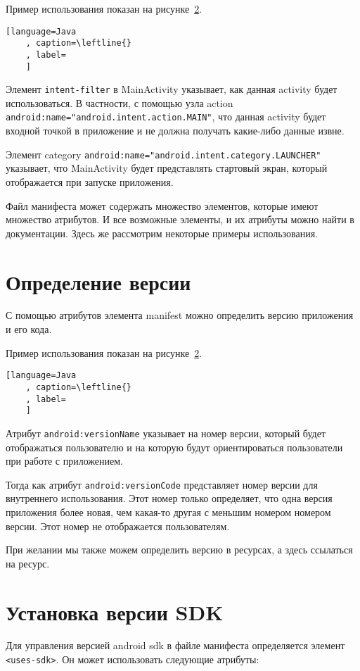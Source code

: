 Пример использования показан на рисунке~\ref{}.

\begin{lstlisting}[language=Java
	, caption=\leftline{}
	, label=
	]
\end{lstlisting}

Элемент \texttt{intent-filter} в MainActivity указывает,
как данная activity будет использоваться. В частности, с помощью узла action
\texttt{android:name="android.intent.action.MAIN"}, что данная activity будет
входной точкой в приложение и не должна получать какие-либо данные извне.\par
Элемент category \texttt{android:name="android.intent.category.LAUNCHER"}
указывает, что MainActivity будет представлять стартовый экран, который
отображается при запуске приложения.\par
Файл манифеста может содержать множество элементов, которые имеют
множество атрибутов. И все возможные элементы, и их атрибуты можно
найти в документации. Здесь же рассмотрим некоторые примеры
использования.

\section{Определение версии}
С помощью атрибутов элемента manifest можно определить версию
приложения и его кода.\par
Пример использования показан на рисунке~\ref{}.

\begin{lstlisting}[language=Java
	, caption=\leftline{}
	, label=
	]
\end{lstlisting}

Атрибут \texttt{android:versionName} указывает на номер версии, который будет
отображаться пользователю и на которую будут ориентироваться
пользователи при работе с приложением.\par
Тогда как атрибут \texttt{android:versionCode} представляет номер версии для
внутреннего использования. Этот номер только определяет, что одна версия
приложения более новая, чем какая-то другая с меньшим номером номером
версии. Этот номер не отображается пользователям.\par
При желании мы также можем определить версию в ресурсах, а здесь
ссылаться на ресурс.

\section{Установка версии SDK}
Для управления версией android sdk в файле манифеста определяется элемент
\texttt{<uses-sdk>}. Он может использовать следующие атрибуты:

